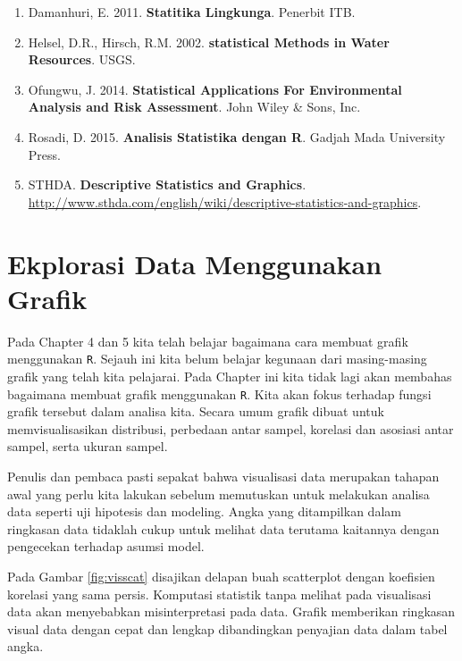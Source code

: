 \documentclass[]{book}
\providecommand{\tightlist}{%
  \setlength{\itemsep}{0pt}\setlength{\parskip}{0pt}}
\begin{document}
\begin{enumerate}
\def\labelenumi{\arabic{enumi}.}
\tightlist
\item
  Damanhuri, E. 2011. \textbf{Statitika Lingkunga}. Penerbit ITB.
\item
  Helsel, D.R., Hirsch, R.M. 2002. \textbf{statistical Methods in Water
  Resources}. USGS.
\item
  Ofungwu, J. 2014. \textbf{Statistical Applications For Environmental
  Analysis and Risk Assessment}. John Wiley \& Sons, Inc.
\item
  Rosadi, D. 2015. \textbf{Analisis Statistika dengan R}. Gadjah Mada
  University Press.
\item
  STHDA. \textbf{Descriptive Statistics and Graphics}.
  \url{http://www.sthda.com/english/wiki/descriptive-statistics-and-graphics}.
\end{enumerate}

\chapter{Ekplorasi Data Menggunakan
Grafik}\label{ekplorasi-data-menggunakan-grafik}

Pada Chapter 4 dan 5 kita telah belajar bagaimana cara membuat grafik
menggunakan \texttt{R}. Sejauh ini kita belum belajar kegunaan dari
masing-masing grafik yang telah kita pelajarai. Pada Chapter ini kita
tidak lagi akan membahas bagaimana membuat grafik menggunakan
\texttt{R}. Kita akan fokus terhadap fungsi grafik tersebut dalam
analisa kita. Secara umum grafik dibuat untuk memvisualisasikan
distribusi, perbedaan antar sampel, korelasi dan asosiasi antar sampel,
serta ukuran sampel.

Penulis dan pembaca pasti sepakat bahwa visualisasi data merupakan
tahapan awal yang perlu kita lakukan sebelum memutuskan untuk melakukan
analisa data seperti uji hipotesis dan modeling. Angka yang ditampilkan
dalam ringkasan data tidaklah cukup untuk melihat data terutama
kaitannya dengan pengecekan terhadap asumsi model.

Pada Gambar \ref{fig:visscat} disajikan delapan buah scatterplot dengan
koefisien korelasi yang sama persis. Komputasi statistik tanpa melihat
pada visualisasi data akan menyebabkan misinterpretasi pada data. Grafik
memberikan ringkasan visual data dengan cepat dan lengkap dibandingkan
penyajian data dalam tabel angka.
\end{document}
